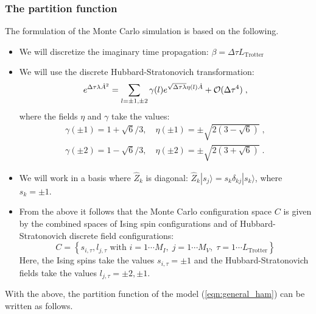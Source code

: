 \subsubsection{The partition function}
The formulation of the  Monte Carlo simulation is based on the following.
\begin{itemize}
\item  We will discretize the imaginary time propagation: $\beta = \Delta \tau L_{\text{Trotter}} $
\item  We will use  the   discrete Hubbard-Stratonovich transformation:
\begin{equation}
\label{HS_squares}
        e^{\Delta \tau  \lambda  \hat{A}^2 } =
        \sum_{ l = \pm 1, \pm 2}  \gamma(l)
e^{ \sqrt{\Delta \tau \lambda }
       \eta(l)  \hat{A} }
                + {\cal O} (\Delta \tau ^4)\;,
\end{equation}
where the fields $\eta$ and $\gamma$ take the values:
\begin{eqnarray}
 \gamma(\pm 1)  = 1 + \sqrt{6}/3, \quad  \eta(\pm 1 ) = \pm \sqrt{2 \left(3 - \sqrt{6} \right)}\;,\\\nonumber
  \gamma(\pm 2) = 1 - \sqrt{6}/3, \quad  \eta(\pm 2 ) = \pm \sqrt{2 \left(3 + \sqrt{6} \right)}\;.
\nonumber
\end{eqnarray}
\item  We will work in  a basis  where  $\hat{Z}_k$ is diagonal: $\hat{Z}_{k}|s_{j}\rangle = s_{k}\delta_{kj}|s_{k}\rangle$, where $s_{k}=\pm 1$.
\item From the above it follows that the  Monte Carlo configuration space $C$  
is given by the combined spaces of Ising spin configurations  and of Hubbard-Stratonovich discrete field configurations:
\begin{equation}
	C = \left\{   s_{i,\tau} ,  l_{j,\tau}  \text{ with }  i=1\cdots M_I,\;  j = 1\cdots M_V,\; \tau=1\cdots L_{\mathrm{Trotter}}  \right\}
\end{equation}
Here, the Ising spins take the values  $s_{i,\tau} = \pm 1$ and  the Hubbard-Stratonovich fields take the values  $l_{j,\tau}  = \pm 2, \pm 1 $.
\end{itemize}
With the above, the partition function of the model (\ref{eqn:general_ham}) can be written as follows.
